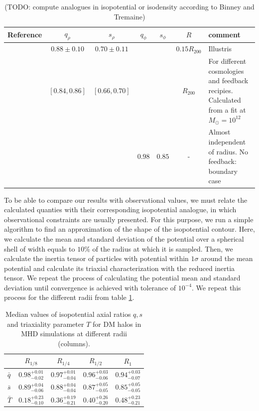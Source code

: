 \documentclass[a4paper,fleqn,usenatbib]{mnras}
\begin{document}
\begin{table}
\begin{tabular}{|l|cc|cc|c|p{4cm}|}\hline
Reference&$q_{\rho}$&$s_{\rho}$&$q_{\phi}$&$s_{\phi}$&$R$&comment\\ \hline \hline
\citet{Chua_et_al._2018}&$\mathbf{0.88\pm0.10}$&$\mathbf{0.70\pm0.11}$&&&$0.15R_{200}$& Illustris\\\hline
%
\citet{Bryan_et_al._2013}&$\mathbf{[0.84,0.86]}$&$\mathbf{[0.66,0.70]}$&&&$R_{200}$& For different cosmologies and feedback recipies. Calculated from a fit at $M_\odot=10^12$\\\hline
%
\multirow{2}{*}{\citet{Abadi_et_al._2010}}&&&$\mathbf{0.98}$&$\mathbf{0.85}$&-& Almost independent of radius. No feedback: boundary case\\\hline
\end{tabular}
\caption{(TODO: compute analogues in isopotential or isodensity according to Binney and Tremaine)}
\end{table}



To be able to compare our results with observational values, we must relate the calculated quanties with their corresponding isopotential analogue, in which observational constraints are usually presented. For this purpose, we run a simple algorithm to find an approximation of the shape of the isopotential contour. Here, we calculate the mean and standard deviation of the potential over a spherical shell of width equals to $10\%$ of the radius at which it is sampled. Then, we calculate the inertia tensor of particles with potential within $1\sigma$ around the mean potential and calculate its triaxial characterization with the reduced inertia tensor. We repeat the process of calculating the potential mean and standard deviation until convergence is achieved with tolerance of $10^{-4}$. We repeat this process for the different radii from table \ref{tabe:isopotential}. \\

\begin{table}
\setlength{\tabcolsep}{3pt}
\begin{tabular}{l|cccc}
 & $R_{1/8}$& $R_{1/4}$& $R_{1/2}$& $R_1$ \\
\hline \hline
$\bar{q}$&$0.98^{+0.01}_{-0.02}$&$0.97^{+0.01}_{-0.04}$&$0.96^{+0.03}_{-0.06}$&$0.94^{+0.03}_{-0.07}$ \\[0.1cm]
$\bar{s}$&$0.89^{+0.04}_{-0.06}$&$0.88^{+0.04}_{-0.04}$&$0.87^{+0.05}_{-0.05}$&$0.85^{+0.05}_{-0.05}$ \\[0.1cm]
$\bar{T}$&$0.18^{+0.23}_{-0.10}$&$0.36^{+0.19}_{-0.21}$&$0.40^{+0.26}_{-0.20}$&$0.48^{+0.23}_{-0.21}$ \\[0.1cm]
\hline
\end{tabular}
\caption{Median values of isopotential axial ratios $q,s$ and triaxiality parameter $T$ for DM halos in MHD simulations at different radii (columns). }
\label{tabe:isopotential}
\end{table}
\end{document}
